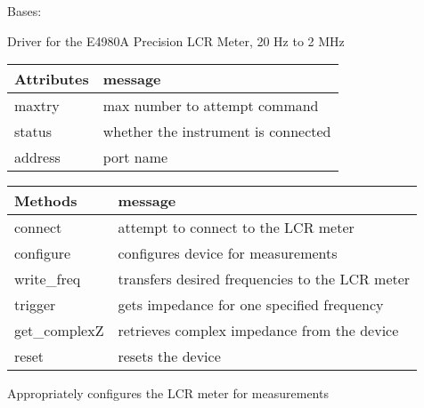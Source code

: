 \documentclass[letterpaper,10pt,english]{sphinxmanual}
\begin{document}
\begin{fulllineitems}
\label{\detokenize{source/laboratory.drivers:laboratory.drivers.lcr.LCR}}
Bases: 

Driver for the E4980A Precision LCR Meter, 20 Hz to 2 MHz


\begin{savenotes}\sphinxattablestart
\centering
\begin{tabulary}{\linewidth}[t]{|T|T|}
\hline
\sphinxstyletheadfamily 
Attributes
&\sphinxstyletheadfamily 
message
\\
\hline
maxtry
&
max number to attempt command
\\
\hline
status
&
whether the instrument is connected
\\
\hline
address
&
port name
\\
\hline
\end{tabulary}
\par
\sphinxattableend\end{savenotes}


\begin{savenotes}\sphinxattablestart
\centering
\begin{tabulary}{\linewidth}[t]{|T|T|}
\hline
\sphinxstyletheadfamily 
Methods
&\sphinxstyletheadfamily 
message
\\
\hline
connect
&
attempt to connect to the LCR meter
\\
\hline
configure
&
configures device for measurements
\\
\hline
write\_freq
&
transfers desired frequencies to the LCR meter
\\
\hline
trigger
&
gets impedance for one specified frequency
\\
\hline
get\_complexZ
&
retrieves complex impedance from the device
\\
\hline
reset
&
resets the device
\\
\hline
\end{tabulary}
\par
\sphinxattableend\end{savenotes}

\begin{fulllineitems}
\label{\detokenize{source/laboratory.drivers:laboratory.drivers.lcr.LCR.configure}}
Appropriately configures the LCR meter for measurements


\end{fulllineitems}
\end{fulllineitems}
\end{document}

